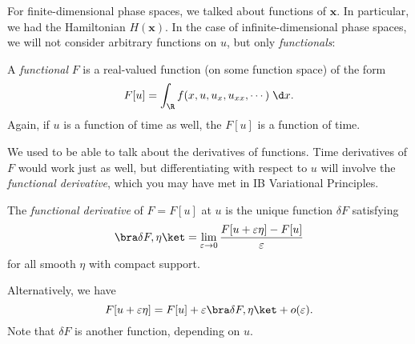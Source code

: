 \documentclass[a4paper]{article}
\begin{document}
For finite-dimensional phase spaces, we talked about functions of $\mathbf{x}$. In particular, we had the Hamiltonian $H(\mathbf{x})$. In the case of infinite-dimensional phase spaces, we will not consider arbitrary functions on $u$, but only \emph{functionals}:

\begin{defi}[Functional]
  A \emph{functional} $F$ is a real-valued function (on some function space) of the form
  \[
    F[u] = \int_\R f(x, u, u_x, u_{xx}, \cdots)\;\d x.
  \]
  Again, if $u$ is a function of time as well, the $F[u]$ is a function of time.
\end{defi}

We used to be able to talk about the derivatives of functions. Time derivatives of $F$ would work just as well, but differentiating with respect to $u$ will involve the \emph{functional derivative}, which you may have met in IB Variational Principles.

\begin{defi}
  The \emph{functional derivative} of $F = F[u]$ at $u$ is the unique function $\delta F$ satisfying
  \[
    \bra \delta F, \eta\ket = \lim_{\varepsilon \to 0} \frac{F[u + \varepsilon \eta] - F[u]}{\varepsilon}
  \]
  for all smooth $\eta$ with compact support.

  Alternatively, we have
  \[
    F[u + \varepsilon \eta] = F[u] + \varepsilon \bra \delta F, \eta\ket + o (\varepsilon).
  \]
  Note that $\delta F$ is another function, depending on $u$.
\end{defi}
\end{document}
